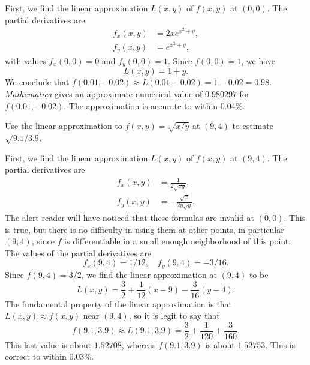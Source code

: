 \documentclass[12pt]{exam}
\begin{document}
\begin{questions}
\begin{solution}
    First, we find the linear approximation $L(x,y)$ of $f(x,y)$ at $(0,0)$. The partial derivatives are
    \begin{align*}
        f_x(x,y) &= 2x e^{x^2+y}, \\
        f_y(x,y) &= e^{x^2+y},
    \end{align*}
    with values $f_x(0,0) = 0$ and $f_y(0,0) = 1$. Since $f(0,0) = 1$, we have
    \[
        L(x,y) = 1 + y.
    \]
    We conclude that $f(0.01,-0.02) \approx L(0.01,-0.02) = 1 - 0.02 = 0.98$. \emph{Mathematica} gives an approximate numerical value of $0.980297$ for $f(0.01,-0.02)$. The approximation is accurate to within 0.04\%.
\end{solution}

\question Use the linear approximation to $f(x,y) = \sqrt{x/y}$ at $(9,4)$ to estimate $\sqrt{9.1/3.9}$. 

\begin{solution}
    First, we find the linear approximation $L(x,y)$ of $f(x,y)$ at $(9,4)$. The partial derivatives are
    \begin{align*}
        f_x(x,y) &= \frac{1}{2 \sqrt{xy}}, \\
        f_y(x,y) &= -\frac{\sqrt{x}}{2y \sqrt{y}}.
    \end{align*}
    The alert reader will have noticed that these formulas are invalid at $(0,0)$. This is true, but there is no difficulty in using them at other points, in particular $(9,4)$, since $f$ is differentiable in a small enough neighborhood of this point. The values of the partial derivatives are
    \[
        f_x(9,4) = 1/12, \quad f_y(9,4) = -3/16.
    \]
    Since $f(9,4) = 3/2$, we find the linear approximation at $(9,4)$ to be
    \[
        L(x,y) = \frac{3}{2} + \frac{1}{12} \left( x - 9 \right) - \frac{3}{16} \left( y - 4 \right).
    \]
    The fundamental property of the linear approximation is that $L(x,y) \approx f(x,y)$ near $(9,4)$, so it is legit to say that
    \[
        f(9.1,3.9) \approx L(9.1,3.9) = \frac{3}{2} + \frac{1}{120} + \frac{3}{160}. 
    \]
    This last value is about $1.52708$, whereas $f(9.1,3.9)$ is about $1.52753$. This is correct to within 0.03\%.
\end{solution}

\end{questions}
\end{document}
